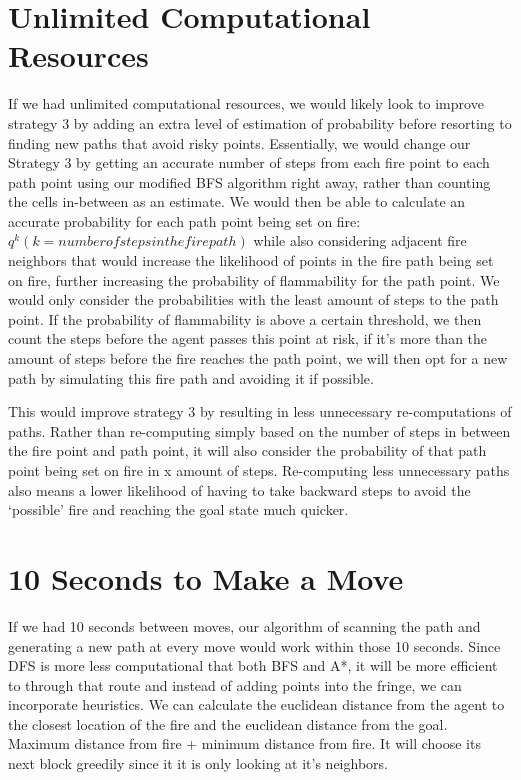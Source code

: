 \documentclass{article}
\begin{document}
\section{Unlimited Computational Resources}
If we had unlimited computational resources, we would likely look to improve strategy 3 by adding an extra level of estimation of probability before resorting to finding new paths that avoid risky points. Essentially, we would change our Strategy 3 by getting an accurate number of steps from each fire point to each path point using our modified BFS algorithm right away, rather than counting the cells in-between as an estimate. We would then be able to calculate an accurate probability for each path point being set on fire: $q^{k} (k = number of steps in the fire path)$ while also considering adjacent fire neighbors that would increase the likelihood of points in the fire path being set on fire, further increasing the probability of flammability for the path point. We would only consider the probabilities with the least amount of steps to the path point. If the probability of flammability is above a certain threshold, we then count the steps before the agent passes this point at risk, if it’s more than the amount of steps before the fire reaches the path point, we will then opt for a new path by simulating this fire path and avoiding it if possible.

 This would improve strategy 3 by resulting in less unnecessary re-computations of paths. Rather than re-computing simply based on the number of steps in between the fire point and path point, it will also consider the probability of that path point being set on fire in x amount of steps. Re-computing less unnecessary paths also means a lower likelihood of having to take backward steps to avoid the ‘possible’ fire and reaching the goal state much quicker.

\section{10 Seconds to Make a Move}
	If we had 10 seconds between moves, our algorithm of scanning the path and generating a new path at every move would work within those 10 seconds.  Since DFS is more less computational that both BFS and A*, it will be more efficient to through that route and instead of adding points into the fringe, we can incorporate heuristics. We can calculate the euclidean distance from the agent to the closest location of the fire and the euclidean distance from the goal. Maximum distance from fire + minimum distance from fire. It will choose its next block greedily since it it is only looking at it's neighbors.  
\end{document}
